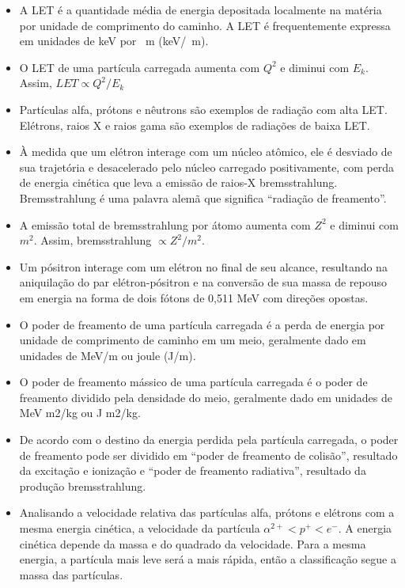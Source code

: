 \documentclass[11pt,a4paper]{article}
\newcounter{exemplo}
\begin{document}
\begin{exemplo}
\begin{itemize}
        \item A LET é a quantidade média de energia depositada localmente na matéria por unidade de comprimento do caminho. A LET é frequentemente expressa em unidades de keV por \unit{\mu m} (\unit{keV/\mu m}).
        
        \item O LET de uma partícula carregada aumenta com $Q^2$ e diminui com $E_k$. Assim, $LET \propto Q^2/E_k$
        
        \item Partículas alfa, prótons e nêutrons são exemplos de radiação com alta LET. Elétrons, raios X e raios gama são exemplos de radiações de baixa LET.
        
        \item À medida que um elétron interage com um núcleo atômico, ele é desviado de sua trajetória e desacelerado pelo núcleo carregado positivamente, com perda de energia cinética que leva a emissão de raios-X bremsstrahlung. Bremsstrahlung é uma palavra alemã que significa ``radiação de freamento''.
        
        \item A emissão total de bremsstrahlung por átomo aumenta com $Z^2$ e diminui com $m^2$. Assim, bremsstrahlung $\propto Z^2/m^2$.
        
        \item Um pósitron interage com um elétron no final de seu alcance, resultando na aniquilação do par elétron-pósitron e na conversão de sua massa de repouso em energia na forma de dois fótons de 0,511 MeV com direções opostas.
        
        \item O poder de freamento de uma partícula carregada é a perda de energia por unidade de comprimento de caminho em um meio, geralmente dado em unidades de MeV/m ou joule (J/m).
        
        \item O poder de freamento mássico de uma partícula carregada é o poder de freamento dividido pela densidade do meio, geralmente dado em unidades de MeV m2/kg ou J m2/kg.
        
        \item De acordo com o destino da energia perdida pela partícula carregada, o poder de freamento pode ser dividido em “poder de freamento de colisão”, resultado da excitação e ionização e “poder de freamento radiativa”, resultado da produção bremsstrahlung.
        
        \item Analisando a velocidade relativa das partículas alfa, prótons e elétrons com a mesma energia cinética, a velocidade da partícula $\alpha^{2+} < p^{+} < e^{-}$. A energia cinética depende da massa e do quadrado da velocidade. Para a mesma energia, a partícula mais leve será a mais rápida, então a classificação segue a massa das partículas.
        

\end{itemize}
\end{exemplo}
\end{document}
